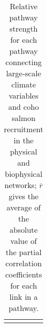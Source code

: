 
{\small
  \libertineLF
  \begin{longtable}{lll}
    \caption[Relative pathway strength for each pathway connecting large-scale
      climate variables and coho salmon recruitment.]{Relative pathway strength
      for each pathway connecting large-scale climate variables and coho salmon
      recruitment in the physical and biophysical networks; $\overline{r}$ gives
      the average of the absolute value of the partial correlation coefficients
      for each link in a pathway.} \\ 
    \hline
    
    \hline
    \label{tab:bn:2}
  \end{longtable}
}
